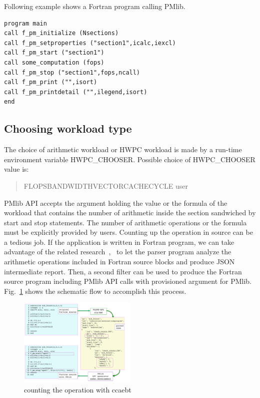 \documentclass[conference]{IEEEtran}
\begin{document}
Following example shows a Fortran program calling PMlib.

\begin{lstlisting}
program main
call f_pm_initialize (Nsections)
call f_pm_setproperties ("section1",icalc,iexcl)
call f_pm_start ("section1")
call some_computation (fops)
call f_pm_stop ("section1",fops,ncall)
call f_pm_print ("",isort)
call f_pm_printdetail ("",ilegend,isort)
end
\end{lstlisting}

%
\subsection{Choosing workload type}
\label{subsection:Choosing-workload-type}

The choice of arithmetic workload or HWPC workload is made by a
run-time environment variable HWPC\_CHOOSER.
Possible choice of HWPC\_CHOOSER value is:
\begin{quote}
\begin{small}
FLOPS\textbar BANDWIDTH\textbar VECTOR\textbar CACHE\textbar CYCLE%
\textbar user
\end{small}
\end{quote}

PMlib API accepts the argument holding the value or the formula of the workload that contains the number of arithmetic inside the section sandwiched by start and stop statements.
The number of arithmetic operations or the formula must be explicitly
provided by users. Counting up the operation in source can be a tedious job.
If the application is written in Fortran program,
we can take advantage of the related research~\cite{Hoshimoto:2015},~\cite{ccaebt:HPCAsia2018}
to let the parser program analyze the arithmetic operations
included in Fortran source blocks and produce JSON intermediate report.
Then, a second filter can be used to produce the
Fortran source program including PMlib API calls with
provisioned argument for PMlib.
Fig.~\ref{fig:ccaebt4PMlib} shows the schematic flow to accomplish this process.

\begin{figure}[tb]
\centering
\includegraphics[width=0.5\textwidth]{figs/ccaebt4PMlib.pdf}
\caption{counting the operation with ccaebt}
\label{fig:ccaebt4PMlib}
\end{figure}
\end{document}
